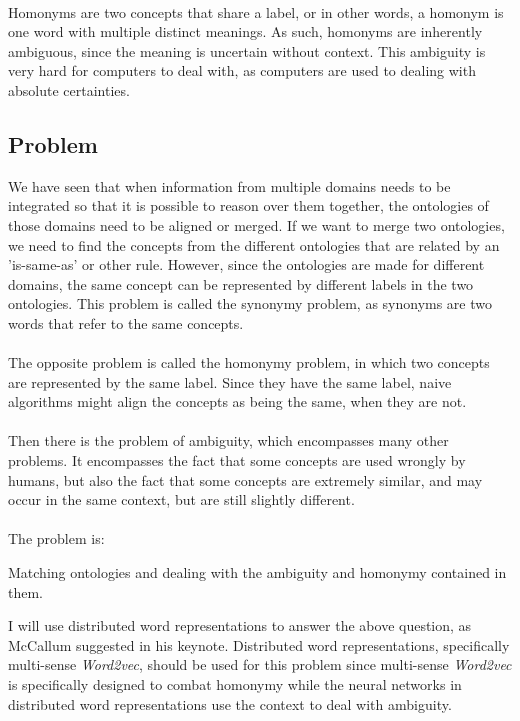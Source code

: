 \documentclass{article}
\begin{document}
 \paragraph{}
 Homonyms are two concepts that share a label, or in other words, a homonym is one word with multiple distinct meanings. As such, homonyms are inherently ambiguous, since the meaning is uncertain without context. This ambiguity is very hard for computers to deal with, as computers are used to dealing with absolute certainties.
  
 \subsection{Problem}
 We have seen that when information from multiple domains needs to be integrated so that it is possible to reason over them together, the ontologies of those domains need to be aligned or merged.
 If we want to merge two ontologies, we need to find the concepts from the different ontologies that are related by an 'is-same-as' or other rule.
 However, since the ontologies are made for different domains, the same concept can be represented by different labels in the two ontologies. This problem is called the synonymy problem, as synonyms are two words that refer to the same concepts.
 \paragraph{}
 The opposite problem is called the homonymy problem, in which two concepts are represented by the same label. Since they have the same label, naive algorithms might align the concepts as being the same, when they are not.
 \paragraph{}
 Then there is the problem of ambiguity, which encompasses many other problems. It encompasses the fact that some concepts are used wrongly by humans, but also the fact that some concepts are extremely similar, and may occur in the same context, but are still slightly different.
 \paragraph{}
 The problem is:
 
 {\centering
  Matching ontologies and dealing with the ambiguity and homonymy contained in them.
 }

  I will use distributed word representations to answer the above question, as McCallum suggested in his keynote. Distributed word representations, specifically multi-sense \emph{Word2vec}, should be used for this problem since multi-sense \emph{Word2vec} is specifically designed to combat homonymy while the neural networks in distributed word representations use the context to deal with ambiguity.
  
\end{document}
